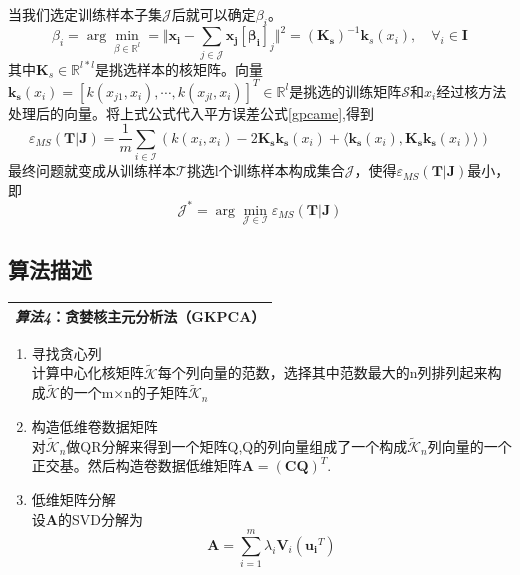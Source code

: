 \documentclass[12pt,a4paper,CJK]{beamer}
\begin{document}
\begin{CJK*}{UTF8}{gkai}
\begin{frame}{\subsecname}
当我们选定训练样本子集$\mathcal{J}$后就可以确定$\beta_i$。
\begin{equation}
\beta_i=\arg\min_{\beta \in \mathbb{R}^l}
=\Vert \boldsymbol{x_i}-\sum_{j \in \mathcal{J}} \boldsymbol{x_j}[\mathbf{\beta_i}]_j \Vert^2
=(\mathbf{K_s})^{-1}\boldsymbol{k}_s(x_i), \quad \forall_i \in \mathbf{I}
\end{equation}
其中$\mathbf{K}_s \in \mathbb{R}^{l*l}$是挑选样本的核矩阵。向量$\mathbf{k_s}(x_i)=[k(x_{j1},x_i),\cdots,k(x_{jl},x_i)]^T \in \mathbb{R}^l$是挑选的训练矩阵$\mathcal{S}$和$x_i$经过核方法处理后的向量。将上式公式代入平方误差公式\ref{gpcame},得到
\begin{equation}
\varepsilon_{MS}(\boldsymbol{T}|\boldsymbol{J})=
\frac{1}{m}\sum_{i \in \mathcal{I}}(k(x_i,x_i)-2\mathbf{K_s}\boldsymbol{k_s}(x_i)+
\langle \boldsymbol{k_s}(x_i),\mathbf{K_s}\boldsymbol{k_s}(x_i) \rangle)
\end{equation}
最终问题就变成从训练样本$\mathcal{T}$挑选l个训练样本构成集合$\mathcal{J}$，使得$\varepsilon_{MS}(\boldsymbol{T}|\boldsymbol{J})$最小，即
\begin{equation}
\mathcal{J^*}=\arg\min_{\mathcal{J} \in \mathcal{I}}\varepsilon_{MS}(\boldsymbol{T}|\boldsymbol{J})
\end{equation}
\end{frame}


\subsection{算法描述}
\begin{frame}{\subsecname}
\begin{table}[!htp]
\label{notation}
\center
\begin{tabular}{|L{0.9\textwidth}|}
\hline
\textit{算法4}：贪婪核主元分析法（GKPCA）\cite{9} \\
\hline
\end{tabular}
\end{table}
\begin{enumerate}
\item 寻找贪心列\\
计算中心化核矩阵$\tilde{\mathcal{K}}$每个列向量的范数，选择其中范数最大的n列排列起来构成$\tilde{\mathcal{K}}$的一个m×n的子矩阵$\tilde{\mathcal{K}}_n$
\item  构造低维卷数据\cite{7}\cite{8}矩阵\\
对$\tilde{\mathcal{K}}_n$做QR分解来得到一个矩阵Q,Q的列向量组成了一个构成$\tilde{\mathcal{K}}_n$列向量的一个正交基。然后构造卷数据低维矩阵$\mathbf{A}=(\mathbf{C}\mathbf{Q})^T$.
\item 低维矩阵分解\\
设$\mathbf{A}$的SVD分解为
\begin{equation}
\mathbf{A}=\sum_{i=1}^m \lambda_i \mathbf{V}_i(\boldsymbol{u_i}^T)
\end{equation}
\end{enumerate}


\end{frame}
\end{CJK*}
\end{document}
